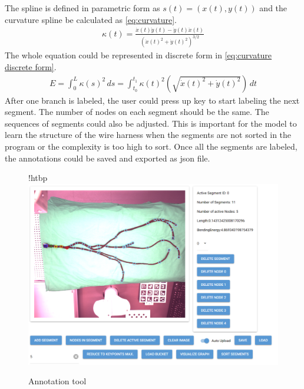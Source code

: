     The spline is defined in parametric form as $s(t) = (x(t),y(t))$ and the curvature spline be calculated as \autoref{eq:curvature}. 
    \begin{equation}
        \begin{aligned}
            \kappa(t) = \frac{\dot{x}(t) \ddot{y}(t) - \dot{y}(t) \ddot{x}(t)}{(\dot{x}(t)^2 + \dot{y}(t)^2)^{3/2}}
            \label{eq:curvature}
        \end{aligned}
    \end{equation}
    The whole equation could be represented in discrete form in \autoref{eq:curvature discrete form}.
    \begin{equation}
        \begin{aligned}
            E = \int_{0}^{L} \kappa(s)^2 \, ds = \int_{t_0}^{t_1} \kappa(t)^2 \left( \sqrt{\dot{x}(t)^2 + \dot{y}(t)^2} \right) \, dt
            \label{eq:curvature discrete form}
        \end{aligned}
    \end{equation}
    After one branch is labeled, the user could press up key to start labeling the next segment. The number of nodes on each segment should be the same. The sequences of 
    segments could also be adjusted. This is important for the model to learn the structure of the wire harness when the segments are not sorted in the program or the complexity 
    is too high to sort. Once all the segments are labeled, the annotations could be saved and exported as json file.
    \begin{figure}{!htbp}
        \centering
        \includegraphics[width=0.9\linewidth]{example_images/NiceGUIInterface.png}
        \caption{Annotation tool}
        \label{Annotation tool}
    \end{figure}
